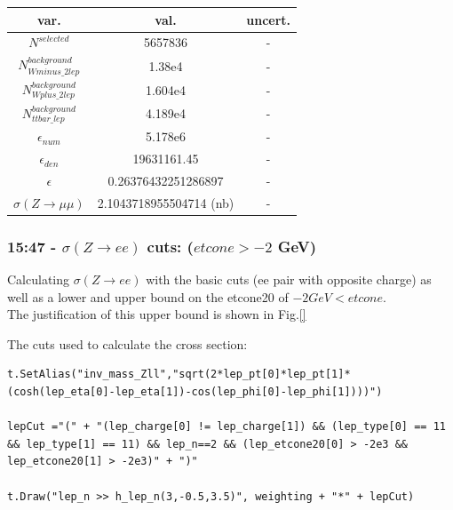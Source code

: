 \begin{tabular}{ | c | c | c |}
  \hline			
  var. & val. & uncert. \\
  \hline 
  
  $N^{selected}$ & 5657836 & - \\
  
  $N^{background}_{Wminus\_2lep}$ & 1.38e4 & - \\
  
  $N^{background}_{Wplus\_2lep}$ & 1.604e4 & - \\
  
  $N^{background}_{ttbar\_lep}$ & 4.189e4 & - \\
  
  $\epsilon_{num}$ & 5.178e6 & - \\
  
  $\epsilon_{den}$ & 19631161.45 & - \\
  \hline  
  $\epsilon$ &  0.26376432251286897 & - \\
  $\sigma(Z \rightarrow \mu\mu)$ &  2.1043718955504714 (nb) & - \\
  \hline  
\end{tabular}


\subsubsection*{15:47 - $\sigma(Z \rightarrow ee)$ cuts: ($etcone > -2$ GeV)}
Calculating $\sigma(Z \rightarrow ee)$ with the basic cuts (ee pair with opposite charge) as well as a lower and upper bound on the etcone20 of $-2 GeV < etcone$.   
\\
The justification of this upper bound is shown in Fig.\ref{}

The cuts used to calculate the cross section:
\begin{lstlisting}
t.SetAlias("inv_mass_Zll","sqrt(2*lep_pt[0]*lep_pt[1]*(cosh(lep_eta[0]-lep_eta[1])-cos(lep_phi[0]-lep_phi[1])))")
    
lepCut ="(" + "(lep_charge[0] != lep_charge[1]) && (lep_type[0] == 11 && lep_type[1] == 11) && lep_n==2 && (lep_etcone20[0] > -2e3 && lep_etcone20[1] > -2e3)" + ")"    
  
t.Draw("lep_n >> h_lep_n(3,-0.5,3.5)", weighting + "*" + lepCut)
\end{lstlisting}


